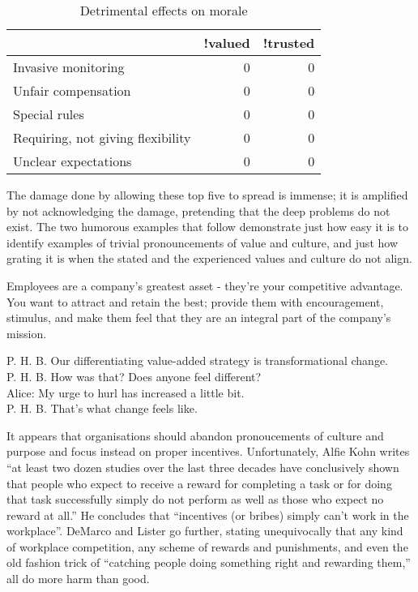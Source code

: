 \begin{table}[h]
    \begin{tabular}{lrr}
        \toprule
                                                & !valued & !trusted \\
        \midrule
        Invasive monitoring                 & 0          & 0 \\
        Unfair compensation                 & 0          & 0 \\
        Special rules                       & 0          & 0 \\         
        Requiring, not giving flexibility   & 0          & 0 \\
        Unclear expectations                & 0          & 0 \\
        \bottomrule
    \end{tabular}
    \caption{Detrimental effects on morale}
    \label{tbl:not-valued-not-trusted}
\end{table}

The damage done by allowing these top five to spread is immense; it is amplified by not acknowledging the damage, pretending that the deep problems do not exist. The two humorous examples that follow demonstrate just how easy it is to identify examples of trivial pronouncements of value and culture, and just how grating it is when the stated and the experienced values and culture do not align.

\begin{example}
Employees are a company's greatest asset - they're your competitive advantage. You want to attract and retain the best; provide them with encouragement, stimulus, and make them feel that they are an integral part of the company's mission.
\end{example}

\begin{example}
P. H. B. Our differentiating value-added strategy is transformational change. \\
P. H. B. How was that? Does anyone feel different? \\
Alice:   My urge to hurl has increased a little bit. \\
P. H. B. That's what change feels like.
\end{example}

It appears that organisations should abandon pronoucements of culture and purpose and focus instead on proper incentives. Unfortunately, Alfie Kohn\cite{alfie-kohn-hbr} writes ``at least two dozen studies over the last three decades have conclusively shown that people who expect to receive a reward for completing a task or for doing that task successfully simply do not perform as well as those who expect no reward at all.'' He concludes that ``incentives (or bribes) simply can't work in the workplace''. DeMarco and Lister\cite{peopleware} go further, stating unequivocally that any kind of workplace competition, any scheme of rewards and punishments, and even the old fashion trick of ``catching people doing something right and rewarding them,'' all do more harm than good. 

